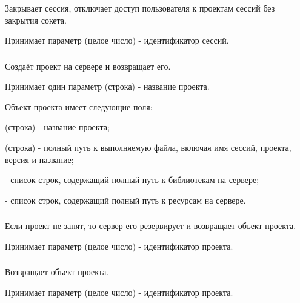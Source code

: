 \subsubsection{}

Закрывает сессия, отключает доступ пользователя к проектам сессий без закрытия сокета.

Принимает параметр  (целое число) - идентификатор сессий.

\subsubsection{}

Создаёт проект на сервере и возвращает его.

Принимает один параметр  (строка) - название проекта.

Объект проекта имеет следующие поля:

\begin{icItems}
	\item {} (строка) - название проекта;
	\item {} (строка) - полный путь к выполняемую файла, включая имя сессий, проекта, версия и название;
	\item {} - список строк, содержащий полный путь к библиотекам на сервере;
	\item {} - список строк, содержащий полный путь к ресурсам на сервере.
\end{icItems}

\subsubsection{}

Если проект не занят, то сервер его резервирует и возвращает объект проекта.

Принимает параметр  (целое число) - идентификатор проекта.

\subsubsection{}

Возвращает объект проекта.

Принимает параметр  (целое число) - идентификатор проекта.

\subsubsection{}

